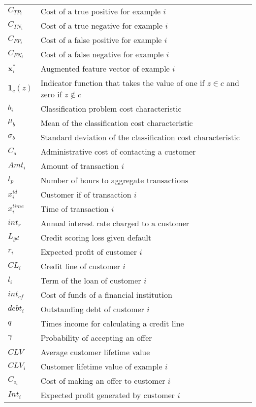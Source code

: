 \begin{tabularx}{\textwidth}{ l X }
$C_{TP_i}$		& Cost of a true positive for example $i$	 \\
$C_{TN_i}$		& Cost of a true negative for example $i$	 \\	
$C_{FP_i}$		& Cost of a false positive for example $i$	 \\	
$C_{FN_i}$		& Cost of a false negative for example $i$	 \\	
$\mathbf{x}_i^*$ 	& Augmented feature vector of example $i$ \\	
$\mathbf{1}_c(z)$ & Indicator function that takes the value of one if $z \in c$ and 
zero if $z \notin c$ \\
$b_i$ & Classification problem cost characteristic \\
$\mu_b$ & Mean of the classification cost characteristic \\
$\sigma_b$ & Standard deviation of the classification cost characteristic \\
$C_a$ & Administrative cost of contacting a customer \\
$Amt_i$ & Amount of transaction $i$ \\
$t_p$ & Number of hours to aggregate transactions\\
$x_i^{id}$ & Customer if of transaction $i$ \\
$x_i^{time}$ & Time of transaction $i$ \\
$int_r$ & Annual interest rate charged to a customer \\
$L_{gd}$ & Credit scoring loss given default \\
$r_i$ & Expected profit of customer $i$ \\
$CL_i$ & Credit line of customer $i$ \\
$l_i$ & Term of the loan of customer $i$\\
$int_{cf}$ & Cost of funds of a financial institution \\
$debt_i$ & Outstanding debt of customer $i$\\
$q$ & Times income for calculating a credit line \\
$\gamma$  & Probability of accepting an offer \\
$CLV$ & Average customer lifetime value \\
$CLV_i$ & Customer lifetime value of example $i$ \\
$C_{o_i}$ & Cost of making an offer to customer $i$ \\
$Int_i$ & Expected profit generated by customer $i$ \\
\end{tabularx}
